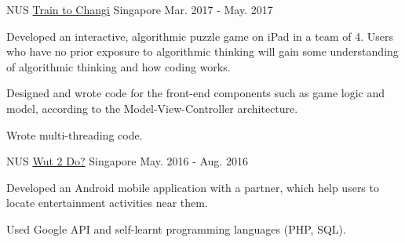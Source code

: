 

\begin{cventries}

  \cventry
    {NUS} %
    {\href{https://github.com/Zhiyuan-Amos/Train-to-Changi}{Train to Changi}} %
    {Singapore} %
    {Mar. 2017 - May. 2017} %
    {
      \begin{cvitems} %
        \item {Developed an interactive, algorithmic puzzle game on iPad in a team of 4. Users who have no prior exposure to algorithmic thinking will gain some understanding of algorithmic thinking and how coding works.}
        \item {Designed and wrote code for the front-end components such as game logic and model, according to the Model-View-Controller architecture.}
        \item {Wrote multi-threading code.}
      \end{cvitems}
    }
  \cventry
    {NUS} %
    {\href{https://github.com/Zhiyuan-Amos/Wut-2-Do}{Wut 2 Do?}} %
    {Singapore} %
    {May. 2016 - Aug. 2016} %
    {
      \begin{cvitems} %
        \item {Developed an Android mobile application with a partner, which help users to locate entertainment activities near them.}
        \item {Used Google API and self-learnt programming languages (PHP, SQL).}
      \end{cvitems}
    }
\end{cventries}
